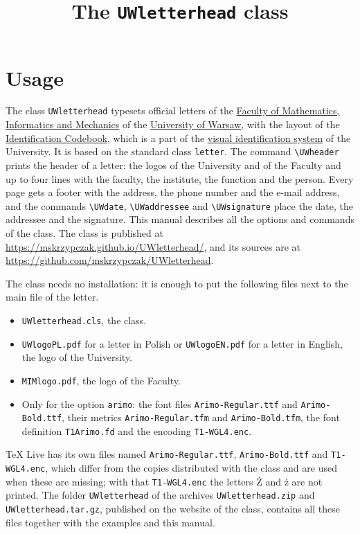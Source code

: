 \documentclass[a4paper,11pt]{article}
\title{The \texttt{UWletterhead} class}
\author{}
\date{}
\begin{document}
\maketitle

\section{Usage}

The class \texttt{UWletterhead} typesets official letters of the \href{https://www.mimuw.edu.pl/}{Faculty of Mathematics, Informatics and Mechanics} of the \href{https://en.uw.edu.pl/}{University of Warsaw}, with the layout of the \href{https://promocja.uw.edu.pl/identyfikacja-wizualna/ksiega-identyfikacji-wizualnej/}{Identification Codebook}, which is a part of the \href{https://promocja.uw.edu.pl/identyfikacja-wizualna/}{visual identification system} of the University.
It is based on the standard class \texttt{letter}.
The command \verb|\UWheader| prints the header of a letter: the logos of the University and of the Faculty and up to four lines with the faculty, the institute, the function and the person.
Every page gets a footer with the address, the phone number and the e-mail address, and the commands \verb|\UWdate|, \verb|\UWaddressee| and \verb|\UWsignature| place the date, the addressee and the signature.
This manual describes all the options and commands of the class.
The class is published at \url{https://mskrzypczak.github.io/UWletterhead/}, and its sources are at \url{https://github.com/mskrzypczak/UWletterhead}.

The class needs no installation: it is enough to put the following files next to the main file of the letter.
\begin{itemize}
\item \texttt{UWletterhead.cls}, the class.
\item \texttt{UWlogoPL.pdf} for a letter in Polish or \texttt{UWlogoEN.pdf} for a letter in English, the logo of the University.
\item \texttt{MIMlogo.pdf}, the logo of the Faculty.
\item Only for the option \texttt{arimo}: the font files \texttt{Arimo-Regular.ttf} and \texttt{Arimo-Bold.ttf}, their metrics \texttt{Arimo-Regular.tfm} and \texttt{Arimo-Bold.tfm}, the font definition \texttt{T1Arimo.fd} and the encoding \texttt{T1-WGL4.enc}.
\end{itemize}
TeX Live has its own files named \texttt{Arimo-Regular.ttf}, \texttt{Arimo-Bold.ttf} and \texttt{T1-WGL4.enc}, which differ from the copies distributed with the class and are used when these are missing; with that \texttt{T1-WGL4.enc} the letters Ż and ż are not printed.
The folder \texttt{UWletterhead} of the archives \texttt{UWletterhead.zip} and \texttt{UWletterhead.tar.gz}, published on the website of the class, contains all these files together with the examples and this manual.
\end{document}
